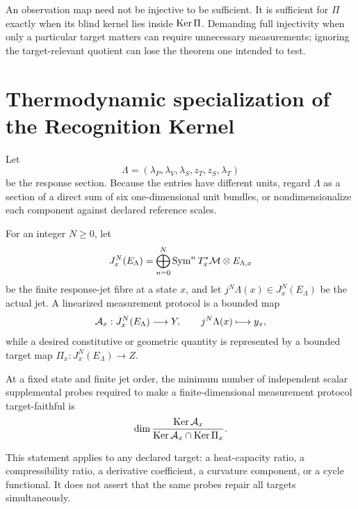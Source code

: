 \begin{remark}
An observation map need not be injective to be sufficient.  It is sufficient for $\Pi$ exactly when its blind kernel lies inside $\operatorname{Ker}\Pi$.  Demanding full injectivity when only a particular target matters can require unnecessary measurements; ignoring the target-relevant quotient can lose the theorem one intended to test.
\end{remark}

\section{Thermodynamic specialization of the Recognition Kernel}

Let
\[
\Lambda
=(\lambda_P,\lambda_V,\lambda_S,z_T,z_S,\lambda_T)
\]
be the response section.  Because the entries have different units, regard $\Lambda$ as a section of a direct sum of six one-dimensional unit bundles, or nondimensionalize each component against declared reference scales.

For an integer $N\ge0$, let
\[
J_x^N(E_\Lambda)
=\bigoplus_{n=0}^N\operatorname{Sym}^nT_x^*\mathcal M\otimes E_{\Lambda,x}
\]
be the finite response-jet fibre at a state $x$, and let $j^N\Lambda(x)\in J_x^N(E_\Lambda)$ be the actual jet.  A linearized measurement protocol is a bounded map
\[
\mathcal A_x:J_x^N(E_\Lambda)\longrightarrow Y,
\qquad
j^N\Lambda(x)\longmapsto y_x,
\]
while a desired constitutive or geometric quantity is represented by a bounded target map $\Pi_x:J_x^N(E_\Lambda)\to Z$.

\begin{corollary}
At a fixed state and finite jet order, the minimum number of independent scalar supplemental probes required to make a finite-dimensional measurement protocol target-faithful is
\[
\dim\frac{\operatorname{Ker}\mathcal A_x}
{\operatorname{Ker}\mathcal A_x\cap\operatorname{Ker}\Pi_x}.
\]
\end{corollary}

This statement applies to any declared target: a heat-capacity ratio, a compressibility ratio, a derivative coefficient, a curvature component, or a cycle functional.  It does not assert that the same probes repair all targets simultaneously.
